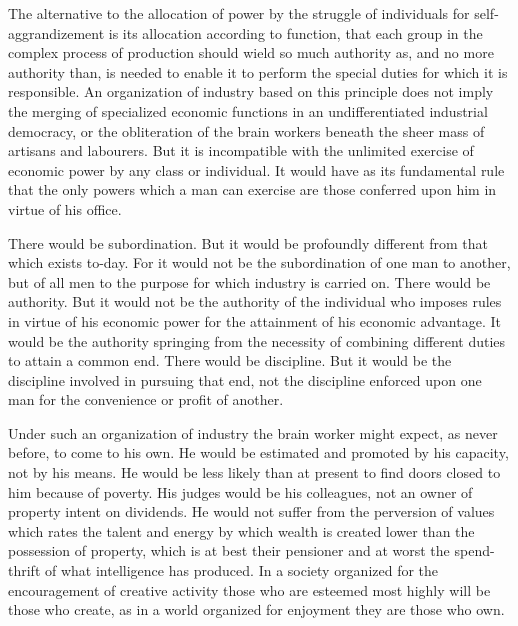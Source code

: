 \documentclass{book}
\begin{document}
The alternative to the allocation of power by the struggle of individuals for self-aggrandizement is its allocation according to function, that each group in the complex process of production should wield so much authority as, and no more authority than, is needed to enable it to perform the special duties for which it is responsible. An organization of industry based on this principle does not imply the merging of specialized economic functions in an undifferentiated industrial democracy, or the obliteration of the brain workers beneath the sheer mass of artisans and labourers. But it is incompatible with the unlimited exercise of economic power by any class or individual. It would have as its fundamental rule that the only powers which a man can exercise are those conferred upon him in virtue of his office.

There would be subordination. But it would be profoundly different from that which exists to-day. For it would not be the subordination of one man to another, but of all men to the purpose for which industry is carried on. There would be authority. But it would not be the authority of the individual who imposes rules in virtue of his economic power for the attainment of his economic advantage. It would be the authority springing from the necessity of combining different duties to attain a common end. There would be discipline. But it would be the discipline involved in pursuing that end, not the discipline enforced upon one man for the convenience or profit of another.

Under such an organization of industry the brain worker might expect, as never before, to come to his own. He would be estimated and promoted by his capacity, not by his means. He would be less likely than at present to find doors closed to him because of poverty. His judges would be his colleagues, not an owner of property intent on dividends. He would not suffer from the perversion of values which rates the talent and energy by which wealth is created lower than the possession of property, which is at best their pensioner and at worst the spend-thrift of what intelligence has produced. In a society organized for the encouragement of creative activity those who are esteemed most highly will be those who create, as in a world organized for enjoyment they are those who own.
\end{document}
